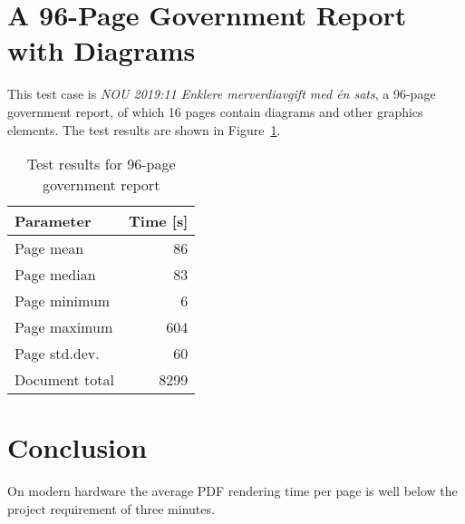 \documentclass[a4paper,11pt]{article}
\begin{document}
\section{A 96-Page Government Report with Diagrams}

This test case is \emph{NOU 2019:11 Enklere merverdiavgift med én sats}, a 96-page government report, of which 16 pages contain diagrams and other graphics elements.
The test results are shown in Figure~\ref{tab:96-page-doc}.

\begin{table}[htbp]
  \centering\small
  \begin{tabular}{@{}lr@{}}
    \hline
    Parameter      & Time [s] \\
    \hline
    Page mean      & 86  \\
    Page median    & 83  \\
    Page minimum   & 6   \\
    Page maximum   & 604  \\
    Page std.dev.  & 60   \\
    Document total & 8299 \\
    \hline
  \end{tabular}
  \caption{Test results for 96-page government report}
  \label{tab:96-page-doc}
\end{table}

\section{Conclusion}

On modern hardware the average PDF rendering time per page is well below the project requirement of three minutes.
\end{document}
